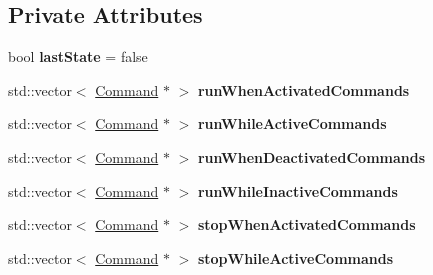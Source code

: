 \subsection*{Private Attributes}
\begin{DoxyCompactItemize}
\item 
\mbox{\label{classlib_iterative_robot_1_1_trigger_ae053034579fc72b555c2052c37c1e410}} 
bool {\bfseries last\+State} = false
\item 
\mbox{\label{classlib_iterative_robot_1_1_trigger_a0216c1f8ae6ad31c6ba15f9c62079828}} 
std\+::vector$<$ \mbox{\hyperlink{classlib_iterative_robot_1_1_command}{Command}} $\ast$ $>$ {\bfseries run\+When\+Activated\+Commands}
\item 
\mbox{\label{classlib_iterative_robot_1_1_trigger_a12ae7732c77bcc9f187e60929762f0ec}} 
std\+::vector$<$ \mbox{\hyperlink{classlib_iterative_robot_1_1_command}{Command}} $\ast$ $>$ {\bfseries run\+While\+Active\+Commands}
\item 
\mbox{\label{classlib_iterative_robot_1_1_trigger_a43ea9409f119a57f0da1b3cdc6c4e8f8}} 
std\+::vector$<$ \mbox{\hyperlink{classlib_iterative_robot_1_1_command}{Command}} $\ast$ $>$ {\bfseries run\+When\+Deactivated\+Commands}
\item 
\mbox{\label{classlib_iterative_robot_1_1_trigger_ab2abdd098fa750a75f175254aeb02af6}} 
std\+::vector$<$ \mbox{\hyperlink{classlib_iterative_robot_1_1_command}{Command}} $\ast$ $>$ {\bfseries run\+While\+Inactive\+Commands}
\item 
\mbox{\label{classlib_iterative_robot_1_1_trigger_a5d326d8b356575d12f7b6577862d3065}} 
std\+::vector$<$ \mbox{\hyperlink{classlib_iterative_robot_1_1_command}{Command}} $\ast$ $>$ {\bfseries stop\+When\+Activated\+Commands}
\item 
\mbox{\label{classlib_iterative_robot_1_1_trigger_a183904873b9167490e189d63faa4e1d8}} 
std\+::vector$<$ \mbox{\hyperlink{classlib_iterative_robot_1_1_command}{Command}} $\ast$ $>$ {\bfseries stop\+While\+Active\+Commands}

\end{DoxyCompactItemize}

